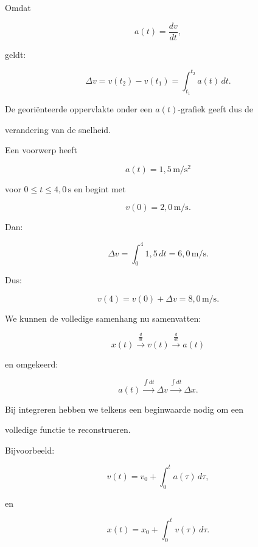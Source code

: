 \documentclass{ximera}
\begin{document}

Omdat

\[a(t)=\frac{dv}{dt},\]

geldt:

\[\boxed{ \Delta v = v(t_2)-v(t_1) = \int_{t_1}^{t_2}a(t)\,dt. }\]

De georiënteerde oppervlakte onder een $a(t)$-grafiek geeft dus de

verandering van de snelheid.

\begin{voorbeeld}

Een voorwerp heeft

\[a(t)=1,5\,\mathrm{m/s^2}\]

voor $0\leq t\leq4,0\,\mathrm{s}$ en begint met

\[v(0)=2,0\,\mathrm{m/s}.\]

Dan:

\[\Delta v = \int_0^4 1,5\,dt = 6,0\,\mathrm{m/s}.\]

Dus:

\[v(4)=v(0)+\Delta v = 8,0\,\mathrm{m/s}.\]

\end{voorbeeld}


We kunnen de volledige samenhang nu samenvatten:

\[\boxed{ x(t) \xrightarrow{\frac{d}{dt}} v(t) \xrightarrow{\frac{d}{dt}} a(t) }\]

en omgekeerd:

\[\boxed{ a(t) \xrightarrow{\int dt} \Delta v \xrightarrow{\int dt} \Delta x. }\]

Bij integreren hebben we telkens een beginwaarde nodig om een

volledige functie te reconstrueren.

Bijvoorbeeld:

\[v(t)=v_0+\int_0^t a(\tau)\,d\tau,\]

en

\[x(t)=x_0+\int_0^t v(\tau)\,d\tau.\]
\end{document}
